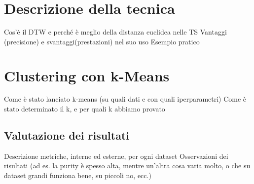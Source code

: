 \section{Descrizione della tecnica}
Cos'è il DTW e perché è meglio della distanza euclidea nelle TS
Vantaggi (precisione) e svantaggi(prestazioni) nel suo uso
Esempio pratico

\section{Clustering con k-Means}
Come è stato lanciato k-means (su quali dati e con quali iperparametri)
Come è stato determinato il k, e per quali k abbiamo provato

\subsection{Valutazione dei risultati}
Descrizione metriche, interne ed esterne, per ogni dataset
Osservazioni dei risultati (ad es. la purity è spesso alta, mentre un'altra cosa varia molto, o che su dataset grandi funziona bene, su piccoli no, ecc.)